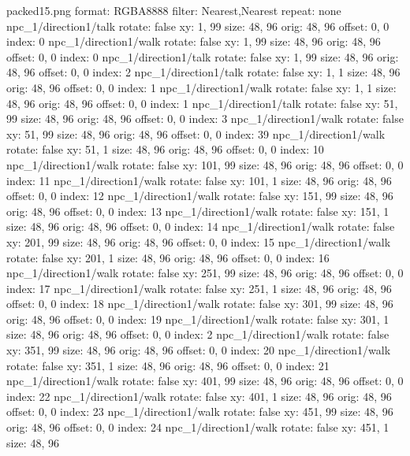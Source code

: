 packed15.png
format: RGBA8888
filter: Nearest,Nearest
repeat: none
npc_1/direction1/talk
  rotate: false
  xy: 1, 99
  size: 48, 96
  orig: 48, 96
  offset: 0, 0
  index: 0
npc_1/direction1/walk
  rotate: false
  xy: 1, 99
  size: 48, 96
  orig: 48, 96
  offset: 0, 0
  index: 0
npc_1/direction1/talk
  rotate: false
  xy: 1, 99
  size: 48, 96
  orig: 48, 96
  offset: 0, 0
  index: 2
npc_1/direction1/talk
  rotate: false
  xy: 1, 1
  size: 48, 96
  orig: 48, 96
  offset: 0, 0
  index: 1
npc_1/direction1/walk
  rotate: false
  xy: 1, 1
  size: 48, 96
  orig: 48, 96
  offset: 0, 0
  index: 1
npc_1/direction1/talk
  rotate: false
  xy: 51, 99
  size: 48, 96
  orig: 48, 96
  offset: 0, 0
  index: 3
npc_1/direction1/walk
  rotate: false
  xy: 51, 99
  size: 48, 96
  orig: 48, 96
  offset: 0, 0
  index: 39
npc_1/direction1/walk
  rotate: false
  xy: 51, 1
  size: 48, 96
  orig: 48, 96
  offset: 0, 0
  index: 10
npc_1/direction1/walk
  rotate: false
  xy: 101, 99
  size: 48, 96
  orig: 48, 96
  offset: 0, 0
  index: 11
npc_1/direction1/walk
  rotate: false
  xy: 101, 1
  size: 48, 96
  orig: 48, 96
  offset: 0, 0
  index: 12
npc_1/direction1/walk
  rotate: false
  xy: 151, 99
  size: 48, 96
  orig: 48, 96
  offset: 0, 0
  index: 13
npc_1/direction1/walk
  rotate: false
  xy: 151, 1
  size: 48, 96
  orig: 48, 96
  offset: 0, 0
  index: 14
npc_1/direction1/walk
  rotate: false
  xy: 201, 99
  size: 48, 96
  orig: 48, 96
  offset: 0, 0
  index: 15
npc_1/direction1/walk
  rotate: false
  xy: 201, 1
  size: 48, 96
  orig: 48, 96
  offset: 0, 0
  index: 16
npc_1/direction1/walk
  rotate: false
  xy: 251, 99
  size: 48, 96
  orig: 48, 96
  offset: 0, 0
  index: 17
npc_1/direction1/walk
  rotate: false
  xy: 251, 1
  size: 48, 96
  orig: 48, 96
  offset: 0, 0
  index: 18
npc_1/direction1/walk
  rotate: false
  xy: 301, 99
  size: 48, 96
  orig: 48, 96
  offset: 0, 0
  index: 19
npc_1/direction1/walk
  rotate: false
  xy: 301, 1
  size: 48, 96
  orig: 48, 96
  offset: 0, 0
  index: 2
npc_1/direction1/walk
  rotate: false
  xy: 351, 99
  size: 48, 96
  orig: 48, 96
  offset: 0, 0
  index: 20
npc_1/direction1/walk
  rotate: false
  xy: 351, 1
  size: 48, 96
  orig: 48, 96
  offset: 0, 0
  index: 21
npc_1/direction1/walk
  rotate: false
  xy: 401, 99
  size: 48, 96
  orig: 48, 96
  offset: 0, 0
  index: 22
npc_1/direction1/walk
  rotate: false
  xy: 401, 1
  size: 48, 96
  orig: 48, 96
  offset: 0, 0
  index: 23
npc_1/direction1/walk
  rotate: false
  xy: 451, 99
  size: 48, 96
  orig: 48, 96
  offset: 0, 0
  index: 24
npc_1/direction1/walk
  rotate: false
  xy: 451, 1
  size: 48, 96
